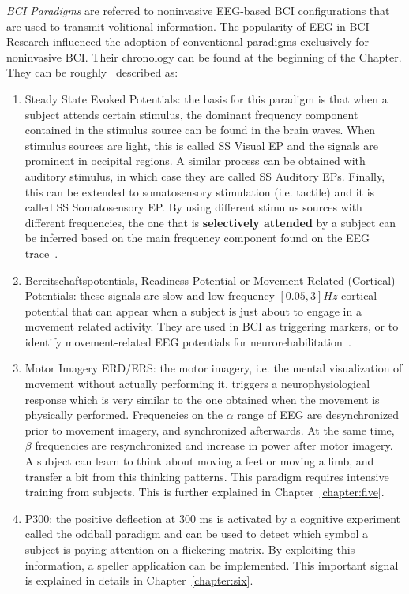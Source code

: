 \textit{BCI Paradigms} are referred to noninvasive EEG-based BCI configurations that are used to transmit volitional information.  The popularity of EEG in BCI Research influenced the adoption of conventional paradigms exclusively for noninvasive BCI.   Their chronology can be found at the beginning of the Chapter. They can be roughly~\cite{Chaudhary2016} described as:

\begin{enumerate}
\item Steady State Evoked Potentials: the basis for this paradigm is that when a subject attends certain stimulus, the dominant frequency component contained in the stimulus source can be found in the brain waves.  When stimulus sources are light, this is called SS Visual EP and the signals are prominent in occipital regions.  A similar process can be obtained with auditory stimulus, in which case they are called SS Auditory EPs.  Finally, this can be extended to somatosensory stimulation (i.e. tactile) and it is called SS Somatosensory EP.  By using different stimulus sources with different frequencies, the one that is \textbf{selectively attended} by a subject can be inferred based on the main frequency component found on the EEG trace~\cite{Nam2010}.
\item Bereitschaftspotentials, Readiness Potential or Movement-Related (Cortical) Potentials: these signals are slow and low frequency $\left[0.05, 3\right] \si{Hz}$ cortical potential that can appear when a subject is just about to engage in a movement related activity.  They are used in BCI as triggering markers, or to identify movement-related EEG potentials for neurorehabilitation~\cite{c52}.
\item Motor Imagery ERD/ERS: the motor imagery, i.e. the mental visualization of movement without actually performing it, triggers a neurophysiological response which is very similar to the one obtained when the movement is physically performed. Frequencies on the $\alpha$ range of EEG are desynchronized prior to movement imagery, and synchronized afterwards. At the same time, $\beta$ frequencies are resynchronized and increase in power after motor imagery. A subject can learn to think about moving a feet or moving a limb, and transfer a bit from this thinking patterns. This paradigm requires intensive training from subjects.  This is further explained in Chapter~\ref{chapter:five}.
\item P300: the positive deflection at 300 \si{\ms} is activated by a cognitive experiment called the oddball paradigm and can be used to detect which symbol a subject is paying attention on a flickering matrix.  By exploiting this information, a speller application can be implemented. This important signal is explained in details in Chapter~\ref{chapter:six}.

\end{enumerate}
